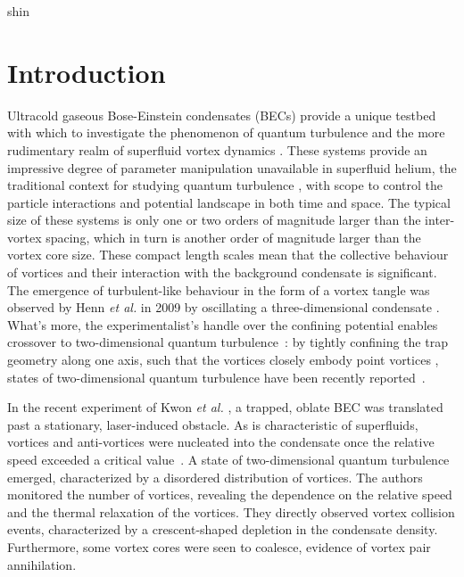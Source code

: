 \begin{chapter}{\label{cha:shin}shin}
\newcommand{\gws}[1]{\textcolor{blue}{#1}}
\newcommand{\ngp}[1]{#1}%
\newcommand{\etal}{{\it et al.}~}
\newcommand{\etalcc}{{\it et al.}}
\newcommand{\boldell}{{\mbox{\boldmath $\ell$}}}
\newcommand{\intr}{\int d \mathbf{r}}
\newcommand{\bfrt}{({\bf{r}},t)}
\newcommand{\fprt}{f({\mathbf{p}}, {\mathbf{r}},t)}

\section{Introduction}
Ultracold gaseous Bose-Einstein condensates (BECs) provide a unique testbed with which to investigate the phenomenon of quantum turbulence and the more rudimentary realm of superfluid vortex dynamics \citep{white_anderson_14,barenghi_skrbek_14}.  These systems provide an impressive degree of parameter manipulation unavailable in superfluid helium, the traditional context for studying quantum turbulence \citep{barenghi_donnelly_01}, with scope to control the particle interactions and potential landscape in both time and space.  The typical size of these systems is only one or two orders of magnitude larger than the inter-vortex spacing, which in turn is another order of magnitude larger than the vortex core size.  These compact length scales mean that the collective behaviour of vortices and their interaction with the background condensate is significant.  The emergence of turbulent-like behaviour in the form of a vortex tangle was observed by Henn {\it et al.} in 2009 by oscillating a three-dimensional condensate \cite{henn_seman_09}.  What's more, the experimentalist's handle over the confining potential enables crossover to two-dimensional quantum turbulence~\cite{parker2005}: by tightly confining the trap geometry along one axis, such that the vortices closely embody point vortices \cite{middelkamp}, states of two-dimensional quantum turbulence have been recently reported~\citep{neely_bradley_13,kwon_moon_14}.

In the recent experiment of Kwon {\it et al.} \citep{kwon_moon_14}, a trapped, oblate BEC was translated past a stationary, laser-induced obstacle.  As is characteristic of superfluids, vortices and anti-vortices were nucleated into the condensate once the relative speed exceeded a critical value~\cite{frisch92}.  \ngp{A state of two-dimensional quantum turbulence emerged, characterized by a disordered distribution of vortices.}  The authors monitored the number of vortices, revealing the dependence on the relative speed and the thermal relaxation of the vortices.  They directly observed vortex collision events, characterized by a crescent-shaped depletion in the condensate density. Furthermore, some vortex cores were seen to coalesce, evidence of vortex pair annihilation.


\end{chapter}
